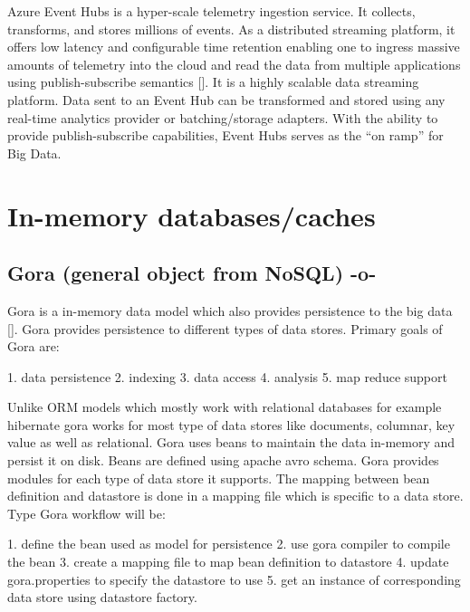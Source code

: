 Azure Event Hubs is a hyper-scale telemetry ingestion service. It
collects, transforms, and stores millions of events. As a distributed
streaming platform, it offers low latency and configurable time
retention enabling one to ingress massive amounts of telemetry into
the cloud and read the data from multiple applications using
publish-subscribe semantics [\cite{www-eventhubs}]. It is a highly
scalable data streaming platform. Data sent to an Event Hub can be
transformed and stored using any real-time analytics provider or
batching/storage adapters. With the ability to provide
publish-subscribe capabilities, Event Hubs serves as the ``on ramp''
for Big Data.



\section{In-memory databases/caches}


\subsection{Gora (general object from NoSQL) -o-}

Gora is a in-memory data model which also provides persistence to the
big data [\cite{www-gora}].  Gora provides persistence to different
types of data stores. Primary goals of Gora are:

     1. data persistence
     2. indexing
     3. data access
     4. analysis
     5. map reduce support

Unlike ORM models which mostly work with relational databases for
example hibernate gora works for most type of data stores like
documents, columnar, key value as well as relational. Gora uses beans
to maintain the data in-memory and persist it on disk. Beans are
defined using apache avro schema. Gora provides modules for each type
of data store it supports.  The mapping between bean definition and
datastore is done in a mapping file which is specific to a data store.
Type Gora workflow will be:

     1. define  the bean used as model for persistence
     2. use gora compiler to compile the bean
     3. create a mapping file to map bean definition to datastore
     4. update gora.properties to specify the datastore to use
     5. get an instance of corresponding data store using datastore factory.

